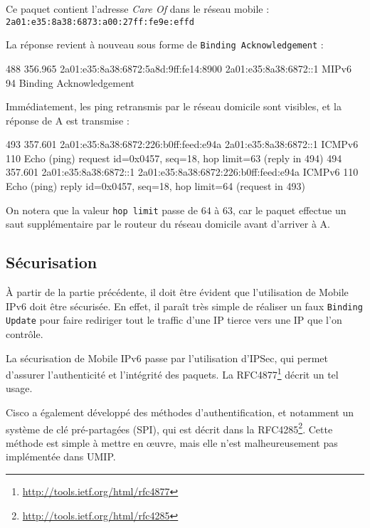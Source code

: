 Ce paquet contient l'adresse \emph{Care Of} dans le réseau mobile : \texttt{2a01:e35:8a38:6873:a00:27ff:fe9e:effd}

La réponse revient à nouveau sous forme de \texttt{Binding Acknowledgement} :

\begin{paquet}
488	356.965	2a01:e35:8a38:6872:5a8d:9ff:fe14:8900	2a01:e35:8a38:6872::1	MIPv6	94	Binding Acknowledgement
\end{paquet}

Immédiatement, les ping retransmis par le réseau domicile sont visibles, et la réponse de A est transmise :

\begin{paquet}
493	357.601	2a01:e35:8a38:6872:226:b0ff:feed:e94a	2a01:e35:8a38:6872::1	ICMPv6	110	Echo (ping) request id=0x0457, seq=18, hop limit=63 (reply in 494)
494	357.601	2a01:e35:8a38:6872::1	2a01:e35:8a38:6872:226:b0ff:feed:e94a	ICMPv6	110	Echo (ping) reply id=0x0457, seq=18, hop limit=64 (request in 493)
\end{paquet}

On notera que la valeur \texttt{hop limit} passe de $64$ à $63$, car le paquet effectue un saut supplémentaire par le routeur du réseau domicile avant d'arriver à A.

\subsection{Sécurisation}

À partir de la partie précédente, il doit être évident que l'utilisation de Mobile IPv6 doit être sécurisée.
En effet, il paraît très simple de réaliser un faux \texttt{Binding Update} pour faire rediriger tout le traffic d'une IP tierce vers une IP que l'on contrôle.

La sécurisation de Mobile IPv6 passe par l'utilisation d'IPSec, qui permet d'assurer l'authenticité et l'intégrité des paquets.
La RFC4877\footnote{\url{http://tools.ietf.org/html/rfc4877}} décrit un tel usage.

Cisco a également développé des méthodes d'authentification, et notamment un système de clé pré-partagées (SPI), qui est décrit dans la RFC4285\footnote{\url{http://tools.ietf.org/html/rfc4285}}.
Cette méthode est simple à mettre en œuvre, mais elle n'est malheureusement pas implémentée dans UMIP.